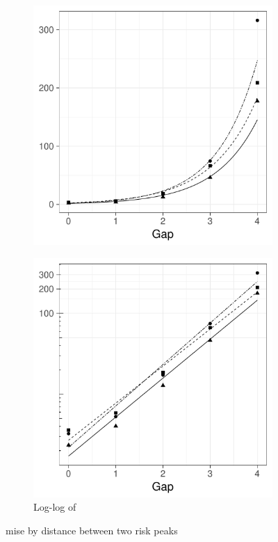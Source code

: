 \begin{figure}[htbp]
    \begin{subfigure}[b]{0.49\textwidth}
        \includegraphics[width=\textwidth]{results/by_pop_risk_distance/NMISE-vs-population-risk-gap}
        \caption{}
        \label{fig:ise:p1.4_100_Gap_risk:nmise}
    \end{subfigure}
    \begin{subfigure}[b]{0.49\textwidth}
        \includegraphics[width=\textwidth]{results/by_pop_risk_distance/NMISE-vs-population-risk-gap-log-log}
        \caption{Log-log of }
        \label{fig:ise:p1.4_100_Gap_risk:nmise_log_log}
    \end{subfigure}    
    \caption{\gls{mise} by distance between two risk peaks}
    \label{fig:ise:p1.4_100_Gap_risk}
\end{figure}

